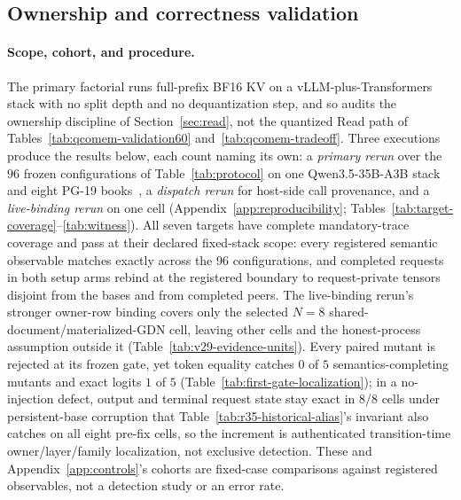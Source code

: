 \documentclass{article}
\begin{document}
\subsection{Ownership and correctness validation}
\label{sec:correctness}
\label{sec:results}

\paragraph{Scope, cohort, and procedure.} \label{sec:target-status} The primary
factorial runs full-prefix BF16 KV on a vLLM-plus-Transformers stack with no
split depth and no dequantization step, and so audits the ownership discipline
of Section~\ref{sec:read}, not the quantized Read path of
Tables~\ref{tab:qcomem-validation60} and~\ref{tab:qcomem-tradeoff}.  Three
executions produce the results below, each count naming its own: a \emph{primary
rerun} over the $96$ frozen configurations of Table~\ref{tab:protocol} on one
Qwen3.5-35B-A3B stack~\citep{qwen2026qwen35,qwen2026qwen35modelcard} and eight
PG-19 books~\citep{rae2020compressive}, a \emph{dispatch rerun} for host-side
call provenance, and a \emph{live-binding rerun} on one cell
(Appendix~\ref{app:reproducibility};
Tables~\ref{tab:target-coverage}--\ref{tab:witness}).
All seven targets have complete mandatory-trace coverage and pass at their
declared fixed-stack scope: every registered semantic observable matches exactly
across the 96 configurations, and completed requests in both setup arms rebind at
the registered boundary to request-private tensors disjoint from the bases and
from completed peers.  The live-binding rerun's stronger owner-row binding covers
only the selected $N=8$ shared-document/materialized-GDN cell, leaving other
cells and the honest-process assumption outside it
(Table~\ref{tab:v29-evidence-units}).  Every paired mutant is rejected at its
frozen gate, yet token equality catches $0$ of $5$ semantics-completing mutants
and exact logits $1$ of $5$ (Table~\ref{tab:first-gate-localization}); in a
no-injection defect, output and terminal request state stay exact in 8/8 cells
under persistent-base corruption that Table~\ref{tab:r35-historical-alias}'s
invariant also catches on all eight pre-fix cells, so the increment is
authenticated transition-time owner/layer/family localization, not exclusive
detection.  These and Appendix~\ref{app:controls}'s cohorts are fixed-case
comparisons against registered observables, not a detection study or an error
rate.
\end{document}
